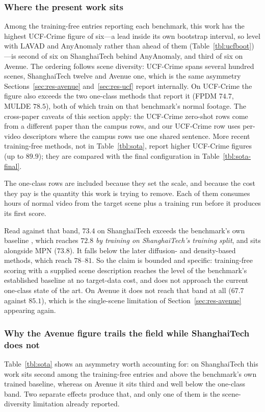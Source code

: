 \documentclass[a4paper,fleqn]{cas-sc}
\begin{document}
\subsubsection{Where the present work sits}
Among the training-free entries reporting each benchmark, this work has the
highest UCF-Crime figure of six---a lead inside its own bootstrap interval, so
level with LAVAD and AnyAnomaly rather than ahead of them
(Table~\ref{tbl:ucfboot})---is second of six on ShanghaiTech behind AnyAnomaly,
and third of six on Avenue. The ordering follows scene diversity: UCF-Crime spans several
hundred scenes, ShanghaiTech twelve and Avenue one, which is the same asymmetry
Sections~\ref{sec:res-avenue} and~\ref{sec:res-ucf} report internally. On
UCF-Crime the figure also exceeds the two one-class methods that report it
(FPDM $74.7$, MULDE $78.5$), both of which train on that benchmark's normal
footage. The cross-paper caveats of this section apply: the UCF-Crime zero-shot
rows come from a different paper than the campus rows, and our UCF-Crime row
uses per-video descriptors where the campus rows use one shared sentence. More
recent training-free methods, not in Table~\ref{tbl:sota}, report higher
UCF-Crime figures (up to $89.9$); they are compared with the final configuration
in Table~\ref{tbl:sota-final}.

The one-class rows are included because they set the scale, and because the
cost they pay is the quantity this work is trying to remove. Each of them
consumes hours of normal video from the target scene plus a training run before
it produces its first score.

Read against that band, $73.4$ on ShanghaiTech exceeds the benchmark's own
baseline \citep{liu2018shanghaitech}, which reaches $72.8$ \emph{by training on
ShanghaiTech's training split}, and sits alongside MPN ($73.8$). It falls below
the later diffusion- and density-based methods, which reach $78$--$81$. So the
claim is bounded and specific: training-free scoring with a supplied scene
description reaches the level of the benchmark's established baseline at no
target-data cost, and does not approach the current one-class state of the art.
On Avenue it does not reach that band at all ($67.7$ against $85.1$), which is
the single-scene limitation of Section~\ref{sec:res-avenue} appearing again.

\subsubsection{Why the Avenue figure trails the field while ShanghaiTech does not}
\label{sec:res-whyavenue}
Table~\ref{tbl:sota} shows an asymmetry worth accounting for: on ShanghaiTech
this work sits second among the training-free entries and above the benchmark's
own trained baseline, whereas on Avenue it sits third and well below the
one-class band. Two separate effects produce that, and only one of them is the
scene-diversity limitation already reported.
\end{document}
